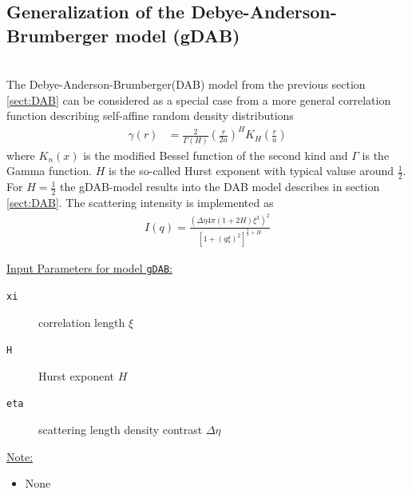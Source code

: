 
\clearpage
\subsection{Generalization of the Debye-Anderson-Brumberger model (gDAB)}
\label{sect:gDAB}~\\
The Debye-Anderson-Brumberger(DAB) model from the previous section \ref{sect:DAB} can be considered as a special case from a more general correlation function describing self-affine random density distributions \cite{Klimes2002,Hunter2006,Andersson2008}
\begin{align}
\gamma(r) &=
\frac{2}{\Gamma(H)}\left(\frac{r}{2a}\right)^H K_H\left(\frac{r}{a}\right)
\end{align}
where $K_n(x)$ is the modified Bessel function of the second kind
and $\Gamma$ is the Gamma function. $H$ is the so-called Hurst
exponent with typical valuse around $\frac12$. For $H=\frac12$ the gDAB-model results into the DAB model describes in section \ref{sect:DAB}. The scattering intensity is implemented as
\begin{align}
I(q) =  \frac{\left(\Delta\eta 4\pi(1+2H)\xi^3\right)^2}{\left[1+(q\xi)^2\right]^{\frac32+H}}
\end{align}


\underline{Input Parameters for model \texttt{gDAB}:}\\
\begin{description}
\item[\texttt{xi}] correlation length $\xi$
\item[\texttt{H}] Hurst exponent $H$
\item[\texttt{eta}] scattering length density contrast $\Delta\eta$
\end{description}

\underline{Note:}
\begin{itemize}
\item None
\end{itemize}


